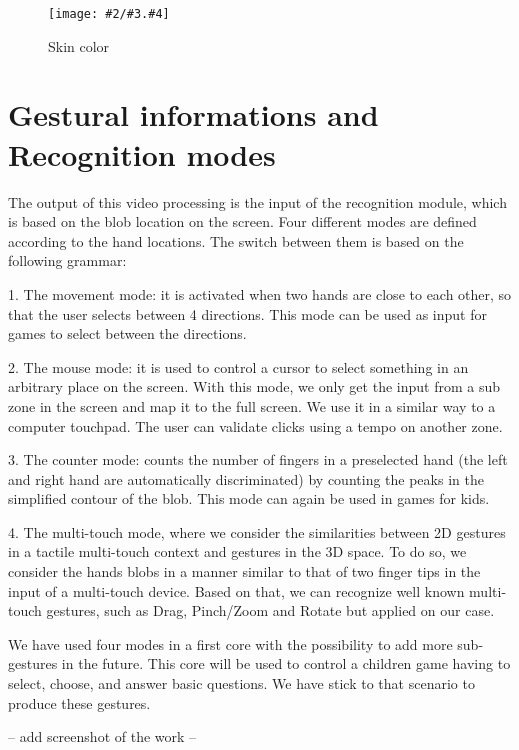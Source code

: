 \documentclass{llncs}
\newcommand\ignore[1]{}
\newcommand{\imagepathext}[5]{%
\begin{figure}[!htbp]
\hfil\texttt{[image: \#2/\#3.\#4]}\hfil
\caption{#5\label{#3}}
\end{figure}}
\newcommand{\png}[2]{\imagepathext{width=\columnwidth}{pics}{#1}{png}{#2}}
\begin{document}
\png{skincolor}{Skin color}

\ignore{
\section{Simplified gesture generation}
Using these blocks we are able to perturb
}

\section{Gestural informations and Recognition modes}
The output of this video processing is the input of the recognition module, which is based on the blob location on the screen. Four different modes are defined according to the hand locations. The switch between them is based on the following grammar:

1. The movement mode:
it is activated when two hands are close to each other, so that the user selects between 4 directions. This mode can be used as input for games to select between the directions.

2. The mouse mode:
it is used to control a cursor to select something in an arbitrary place on the screen. With this mode, we only get the input from a sub zone in the screen and map it to the full screen. We use it in a similar way to a computer touchpad.
The user can validate clicks using a tempo on another zone.

3. The counter mode: counts the number of fingers in a preselected hand (the left and right hand are automatically discriminated) by counting the peaks in the simplified contour of the blob. This mode can again be used in games for kids.

4. The multi-touch mode, where we consider the similarities between 2D gestures in a tactile multi-touch context and gestures in the 3D space. To do so, we consider the hands blobs in a manner similar to that of two finger tips in the input of a multi-touch device. Based on that, we can recognize well known multi-touch gestures, such as Drag, Pinch/Zoom and Rotate but applied on our case.

We have used four modes in a first core with the possibility to add more sub-gestures in the future.
This core will be used to control a children game having to select, choose, and answer basic questions.
We have stick to that scenario to produce these gestures. 

-- add screenshot of the work --
\end{document}
